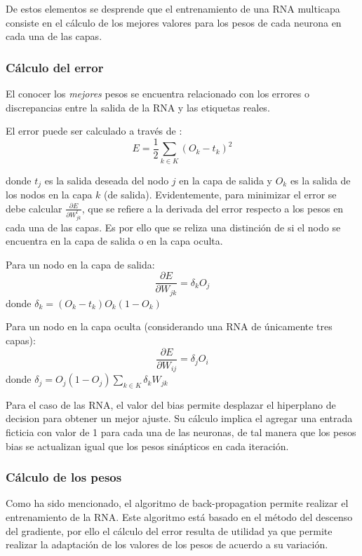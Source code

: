 \documentclass[journal]{IEEEtran}
\begin{document}
De estos elementos se desprende que el entrenamiento de una RNA multicapa consiste en el cálculo de los mejores valores para los pesos de cada neurona en cada una de las capas.

\subsubsection{Cálculo del error} %
\label{ssub:c_lculo_del_error}

El conocer los \emph{mejores} pesos se encuentra relacionado con los errores o discrepancias entre la salida de la RNA y las etiquetas reales.

El error puede ser calculado a través de :
$$
E=\frac{1}{2} \sum_{k\in K}(O_k - t_k)^2
$$

donde $t_j$ es la salida deseada del nodo $j$ en la capa de salida y $O_k$ es la salida de los nodos en la capa $k$ (de salida).
Evidentemente, para minimizar el error se debe calcular $\frac{\partial E}{\partial W_{jk}^l}$, que se refiere a la derivada del error respecto a los pesos en cada una de las capas.
Es por ello que se reliza una distinción de si el nodo se encuentra en la capa de salida o en la capa oculta.

Para un nodo en la capa de salida:
$$
\frac{\partial E}{\partial W_{jk}} = \delta_k O_j
$$
donde $\delta _k = (O_k - t_k) O_k (1 - O_k)$


Para un nodo en la capa oculta (considerando una RNA de únicamente tres capas):
$$
\frac{\partial E}{\partial W_{ij}} = \delta_j O_i
$$
donde $\delta _j = O_j (1 - O_j) \sum_{k \in K}\delta _k W_{jk}$

Para el caso de las RNA, el valor del bias permite desplazar el hiperplano de decision para obtener un mejor ajuste.
Su cálculo implica el agregar una entrada ficticia con valor de 1 para cada una de las neuronas, de tal manera que los pesos bias se actualizan igual que los pesos sinápticos en cada iteración.

\subsubsection{Cálculo de los pesos} %
\label{ssub:c_lculo_de_los_pesos}
Como ha sido mencionado, el algoritmo de back-propagation permite realizar el entrenamiento de la RNA.
Este algoritmo está basado en el método del descenso del gradiente, por ello el cálculo del error resulta de utilidad ya que permite realizar la adaptación de los valores de los pesos de acuerdo a su variación.
\end{document}
